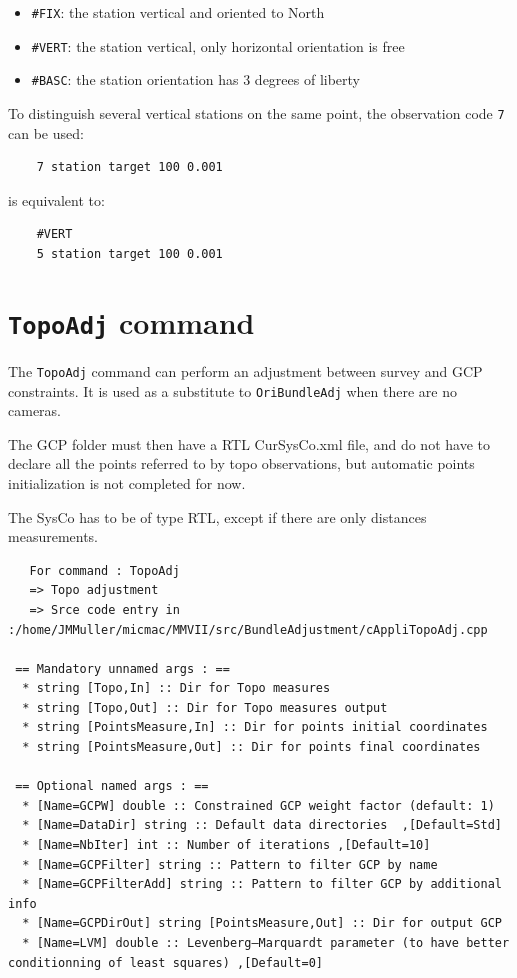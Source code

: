\begin{itemize}
    \item \texttt{\#FIX}: the station vertical and oriented to North
    \item \texttt{\#VERT}: the station vertical, only horizontal orientation is free
    \item \texttt{\#BASC}: the station orientation has 3 degrees of liberty 
\end{itemize}

To distinguish several vertical stations on the same point, the observation code {\tt 7} can be used:

\begin{verbatim}
    7 station target 100 0.001
\end{verbatim}

is equivalent to:

\begin{verbatim}
    #VERT
    5 station target 100 0.001
\end{verbatim}



\section{{\tt TopoAdj} command}

The {\tt TopoAdj} command can perform an adjustment between survey and GCP constraints.
It is used as a substitute to {\tt OriBundleAdj} when there are no cameras.

The GCP folder must then have a RTL CurSysCo.xml file, and do not have to declare all the points
referred to by topo observations, but automatic points initialization is not completed for now.

The SysCo has to be of type RTL, except if there are only distances measurements.

\begin{verbatim}
   For command : TopoAdj 
   => Topo adjustment
   => Srce code entry in :/home/JMMuller/micmac/MMVII/src/BundleAdjustment/cAppliTopoAdj.cpp

 == Mandatory unnamed args : ==
  * string [Topo,In] :: Dir for Topo measures
  * string [Topo,Out] :: Dir for Topo measures output
  * string [PointsMeasure,In] :: Dir for points initial coordinates
  * string [PointsMeasure,Out] :: Dir for points final coordinates

 == Optional named args : ==
  * [Name=GCPW] double :: Constrained GCP weight factor (default: 1)
  * [Name=DataDir] string :: Default data directories  ,[Default=Std]
  * [Name=NbIter] int :: Number of iterations ,[Default=10]
  * [Name=GCPFilter] string :: Pattern to filter GCP by name
  * [Name=GCPFilterAdd] string :: Pattern to filter GCP by additional info
  * [Name=GCPDirOut] string [PointsMeasure,Out] :: Dir for output GCP
  * [Name=LVM] double :: Levenberg–Marquardt parameter (to have better conditionning of least squares) ,[Default=0]

\end{verbatim}



